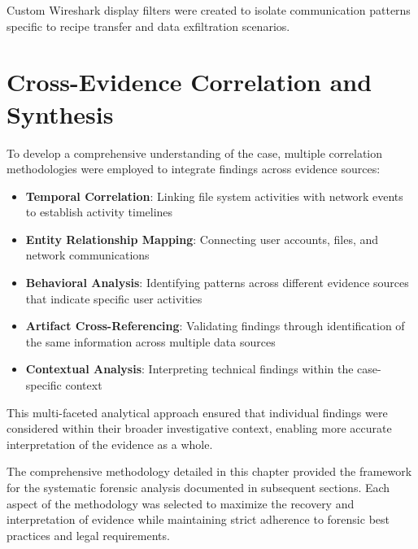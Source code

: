 Custom Wireshark display filters were created to isolate communication patterns specific to recipe transfer and data exfiltration scenarios.

\section{Cross-Evidence Correlation and Synthesis}
To develop a comprehensive understanding of the case, multiple correlation methodologies were employed to integrate findings across evidence sources:

\begin{itemize}
    \item \textbf{Temporal Correlation}: Linking file system activities with network events to establish activity timelines
    
    \item \textbf{Entity Relationship Mapping}: Connecting user accounts, files, and network communications
    
    \item \textbf{Behavioral Analysis}: Identifying patterns across different evidence sources that indicate specific user activities
    
    \item \textbf{Artifact Cross-Referencing}: Validating findings through identification of the same information across multiple data sources
    
    \item \textbf{Contextual Analysis}: Interpreting technical findings within the case-specific context
\end{itemize}

This multi-faceted analytical approach ensured that individual findings were considered within their broader investigative context, enabling more accurate interpretation of the evidence as a whole.

The comprehensive methodology detailed in this chapter provided the framework for the systematic forensic analysis documented in subsequent sections. Each aspect of the methodology was selected to maximize the recovery and interpretation of evidence while maintaining strict adherence to forensic best practices and legal requirements.